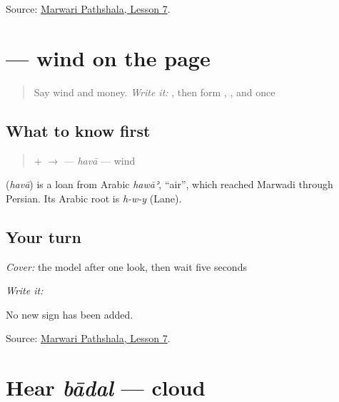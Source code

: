 \begin{tcolorbox}[breakable,colback=teal!4,colframe=teal!35!black,title={Before you move on}]
Source: \href{https://www.marwaripathshala.com/marwari-lesson-7-english}{Marwari Pathshala, Lesson 7}.
\end{tcolorbox}
\section[\texorpdfstring{\mw{हवा} (havā)}{हवा (havā)}]{ — wind on the page}

\label{lesson:MW-C11-hawa}



\begin{quote}
Say wind and money. \emph{Write it:} \textbf{}, then form \textbf{}, \textbf{}, and \textbf{} once
\end{quote}

\subsection*{What to know first}
\begin{quote}
\textbf{} + \textbf{} $\to$ \textbf{} — \emph{havā} — wind
\end{quote}

\begin{cousinweb}
\textbf{} (\emph{havā}) is a loan from Arabic \emph{hawāʾ}, \textquotedblleft{}air\textquotedblright{}, which reached Marwadi through Persian. Its Arabic root is \emph{h-w-y} (Lane).
\end{cousinweb}

\subsection*{Your turn}
\emph{Cover:} the model after one look, then wait five seconds

\emph{Write it:} \textbf{}

No new sign has been added.

\begin{tcolorbox}[breakable,colback=teal!4,colframe=teal!35!black,title={Before you move on}]
Source: \href{https://www.marwaripathshala.com/marwari-lesson-7-english}{Marwari Pathshala, Lesson 7}.
\end{tcolorbox}
\section[bādal]{Hear \emph{bādal} — cloud}

